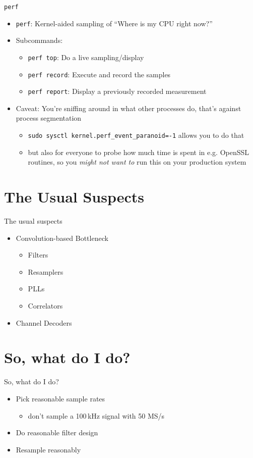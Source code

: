 \begin{frame}{\texttt{perf}}
  \begin{itemize}
    \item \texttt{perf}: Kernel-aided sampling of ``Where is my CPU right now?''
  \item Subcommands:
    \begin{itemize}
    \item \texttt{perf top}: Do a live sampling/display
    \item \texttt{perf record}: Execute and record the samples
    \item \texttt{perf report}: Display a previously recorded measurement
    \end{itemize}
  \item Caveat: You're sniffing around in what other processes do, that's
    against process segmentation
    \begin{itemize}
    \item \texttt{sudo sysctl kernel.perf\_event\_paranoid=-1} allows you to do
      that
    \item but also for everyone to probe how much time is spent in e.g.
        OpenSSL routines, so you \textit{might not want to} run this on your
        production system
    \end{itemize}
  \end{itemize}
\end{frame}
\section{The Usual Suspects}
\begin{frame}{The usual suspects}
  \begin{itemize}
  \item Convolution-based Bottleneck
    \begin{itemize}
    \item Filters
    \item Resamplers
    \item PLLs
      \item Correlators
    \end{itemize}
  \item Channel Decoders
  \end{itemize}
\end{frame}
\section{So, what do I do?}
\begin{frame}{So, what do I do?}
  \begin{itemize}
  \item Pick reasonable sample rates
    \begin{itemize}
    \item don't sample a 100\,kHz signal with 50 MS/s
    \end{itemize}
  \item Do reasonable filter design
  \item Resample reasonably
  \end{itemize}
\end{frame}

